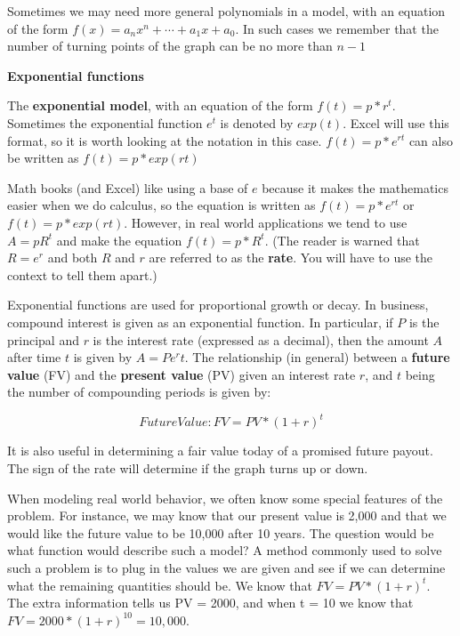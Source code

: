\documentclass[10pt,]{book}
\newcommand{\terminology}[1]{\textbf{#1}}
\theoremstyle{plain}
\theoremstyle{definition}
\newenvironment{assemblage-untitled}{\mdfsetup{%
roundcorner=2ex, backgroundcolor=blue!5,linecolor=blue!75!black,}%
\begin{mdframed}}{\end{mdframed}}
\theoremstyle{definition}
\begin{document}
Sometimes we may need more general polynomials in a model, with an equation of the form \(f(x)=a_n x^n+\cdots+a_1 x+a_0\).  In such cases we remember that the number of turning points of the graph can be no more than \(n-1\)%
\par
\terminology{Exponential functions}%
\par
The \terminology{exponential model}, with an equation of the form \(f(t)=p*r^t\). Sometimes the exponential function \(e^t\) is denoted by \(exp(t)\). Excel will use this format, so it is worth looking at the notation in this case. 
\(f(t)=p*e^{rt}\) can also be written as  \(f(t)=p*exp(r t)\)%
\par
Math books (and Excel) like using a base of \(e\) because it makes the mathematics easier when we do calculus, so the equation is written as \(f(t)=p*e^{rt}\) or \(f(t)=p*exp(r t)\). However, in real world applications we tend to use \(A=pR^t\) and make the equation \(f(t)=p*R^t\).  (The reader is warned that \(R=e^r\) and both \(R\) and \(r\) are referred to as the \terminology{rate}.  You will have to use the context to tell them apart.)%
\par
Exponential functions are used for proportional growth or decay.  In business, compound interest is given as an exponential function. In particular, if \(P\) is the principal and \(r\) is the interest rate (expressed as a decimal), then the amount \(A\) after time \(t\) is given by \(A=P e^rt\). The relationship (in general) between a \terminology{future value} (FV) and the \terminology{present value} (PV) given an interest rate \(r\), and \(t\) being the number of compounding periods is given by:%
\begin{assemblage-untitled}\label{FutureValueDef}
\begin{equation*}Future Value: FV=PV*(1+r)^t\end{equation*}%
\end{assemblage-untitled}
\par
It is also useful in determining a fair value today of a promised future payout. The sign of the rate will determine if the graph turns up or down.%
\par
When modeling real world behavior, we often know some special features of the problem. For instance, we may know that our present value is \textdollar{}2,000 and that we would like the future value to be \textdollar{}10,000 after 10 years. The question would be what function would describe such a model? A method commonly used to solve such a problem is to plug in the values we are given and see if we can determine what the remaining quantities should be. We know that \(FV=PV*(1+r)^t\). The extra information tells us PV = 2000, and when t = 10 we know that \(FV=2000*(1+r)^{10}=10,000\).
\end{document}
